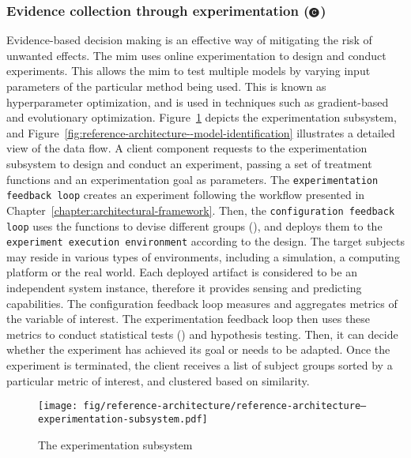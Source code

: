 \subsubsection[Evidence collection through experimentation]{Evidence collection through experimentation ($\encircleblack{C}$)}

Evidence-based decision making is an effective way of mitigating the risk of unwanted effects. The \gls{mim} uses online experimentation to design and conduct experiments. This allows the \gls{mim} to test multiple models by varying input parameters of the particular method being used. This is known as hyperparameter optimization, and is used in techniques such as gradient-based and evolutionary optimization. Figure~\ref{fig:reference-architecture--experimentation-subsystem} depicts the experimentation subsystem, and Figure~\ref{fig:reference-architecture--model-identification} illustrates a detailed view of the data flow. A client component requests to the experimentation subsystem to design and conduct an experiment, passing a set of treatment functions and an experimentation goal as parameters. The \texttt{experimentation feedback loop} creates an experiment following the workflow presented in Chapter~\ref{chapter:architectural-framework}. Then, the \texttt{configuration feedback loop} uses the functions to devise different groups (), and deploys them to the \texttt{experiment execution environment} according to the design. The target subjects may reside in various types of environments, including a simulation, a computing platform or the real world. Each deployed artifact is considered to be an independent system instance, therefore it provides sensing and predicting capabilities. The configuration feedback loop measures and aggregates metrics of the variable of interest. The experimentation feedback loop then uses these metrics to conduct statistical tests () and hypothesis testing. Then, it can decide whether the experiment has achieved its goal or needs to be adapted. Once the experiment is terminated, the client receives a list of subject groups sorted by a particular metric of interest, and clustered based on similarity.

\begin{figure}[h]
	\centering
	\texttt{[image: fig/reference-architecture/reference-architecture--experimentation-subsystem.pdf]}
	\caption{The experimentation subsystem}
	\label{fig:reference-architecture--experimentation-subsystem}
\end{figure}
	
